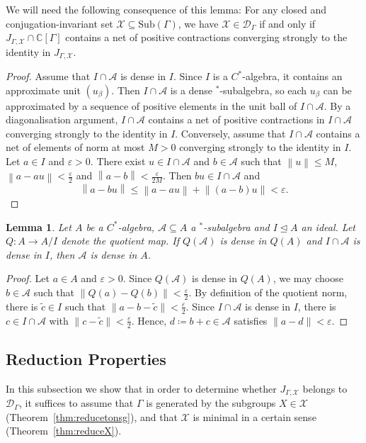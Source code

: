 \documentclass[11pt, oneside, reqno]{amsart}
\newcommand{\norm}[1]{\left\|#1\right\|}
\newcommand{\PRLsep}{\noindent\makebox[\linewidth]{\resizebox{0.3333\linewidth}{1pt}{$\bullet$}}\bigskip}
\newtheorem{lem}[thm]{Lemma}
\theoremstyle{definition}
\theoremstyle{remark}
\numberwithin{equation}{section}
\begin{document}
We will need the following consequence of this lemma: For any closed and conjugation-invariant set $\mathcal{X} \subseteq \text{Sub}(\Gamma)$, we have $\mathcal{X} \in \mathcal{D}_\Gamma$ if and only if $J_{\Gamma, \mathcal{X}} \cap \mathbb{C}[\Gamma]$ contains a net of positive contractions converging strongly to the identity in $J_{\Gamma, \mathcal{X}}$.

\begin{proof}
    Assume that $I \cap \mathcal{A}$ is dense in $I$. Since $I$ is a $C^*$-algebra, it contains an approximate unit $(u_\beta)$. Then $I \cap \mathcal{A}$ is a dense $^*$-subalgebra, so each $u_\beta$ can be approximated by a sequence of positive elements in the unit ball of $I\cap \mathcal{A}$. By a diagonalisation argument, $I\cap\mathcal{A}$ contains a net of positive contractions in $I \cap \mathcal{A}$ converging strongly to the identity in $I$. Conversely, assume that $I \cap \mathcal{A}$ contains a net of elements of norm at most $M>0$ converging strongly to the identity in  $I$. Let $a \in I$ and $\varepsilon >0$. There exist $u \in I \cap \mathcal{A}$ and $b \in \mathcal{A}$ such that $\norm{u} \le M$, $\norm{a-au} < \frac{\varepsilon}{2}$ and $\norm{a-b} < \frac{\varepsilon}{2M}$. Then $bu \in I \cap \mathcal{A}$ and
    \[
    \norm{a-bu} \le \norm{a-au} + \norm{(a-b)u } < \varepsilon.
    \]
\end{proof}


\begin{lem}
    \label{extensions}
    Let $A$ be a $C^{*}$-algebra, $\mathcal{A}\subseteq A$ a $^*$-subalgebra and $I\trianglelefteq A$ an ideal. Let $Q \colon A\to A/I$ denote the quotient map. If $Q(\mathcal{A})$ is dense in $Q(A)$ and $I\cap\mathcal{A}$ is dense in $I$, then $\mathcal{A}$ is dense in $A$.  
\end{lem}

\begin{proof}
   Let $a\in A$ and $\varepsilon > 0$. Since $Q(\mathcal{A})$ is dense in $Q(A)$, we may choose $b\in \mathcal{A}$ such that $\|Q(a)-Q(b)\| < \frac{\varepsilon}{2}$. By definition of the quotient norm, there is $\tilde{c}\in I$ such that $\|a - b - \tilde{c}\| < \frac{\varepsilon}{2}$. Since $I\cap\mathcal{A}$ is dense in $I$, there is $c\in I\cap\mathcal{A}$ with $\|c - \tilde{c}\| < \frac{\varepsilon}{2}$. Hence, $d \coloneq b+c\in \mathcal{A}$ satisfies $\|a - d\| <  \varepsilon$.
\end{proof}

\PRLsep

\subsection{Reduction Properties}\label{subsec:reduction} In this subsection we show that in order to determine whether $J_{\Gamma, \mathcal{X}}$ belongs to $\mathcal{D}_\Gamma$, it suffices to assume that $\Gamma$ is generated by the subgroups $X \in \mathcal{X}$ (Theorem~\ref{thm:reducetonsg}), and that $\mathcal{X}$ is minimal in a certain sense (Theorem~\ref{thm:reduceX}).
\end{document}
